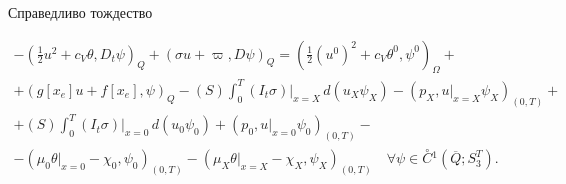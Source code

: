 \documentclass[12pt]{article}
\theoremstyle{plain} %
\newtheorem{lemm}{\hskip\parindent Лемма}[section]
\theoremstyle{definition}
\numberwithin{equation}{section}
\begin{document}
\begin{lemm} Справедливо тождество


\begin{multline}


-(\frac{1}{2}u^2 + c_V\theta, D_t\psi)_Q+


(\sigma u + \varpi, D\psi)_Q =


(\frac{1}{2}(u^0)^2 + c_V\theta^0, \psi^0)_\Omega+\\


%


+ (g[x_e]u + f[x_e],\psi)_Q


-(S)\int_0^T(I_t\sigma)|_{x=X}\,d(u_X\psi_X) -


(p_X, u|_{x=X}\psi_X)_{(0,T)} +\\


%


+(S)\int_0^T(I_t\sigma)|_{x=0}\,d(u_0\psi_0) +


(p_0, u|_{x=0}\psi_0)_{(0,T)}-\\


%


-(\mu_0\theta|_{x=0} -\chi_0,\psi_0)_{(0,T)} -


(\mu_X\theta|_{x=X} -\chi_X,\psi_X)_{(0,T)}


\quad \forall \psi\in \overset{\circ}{C}{}^1(\overline Q;S_3^T).


\end{multline}


\end{lemm}
\end{document}
